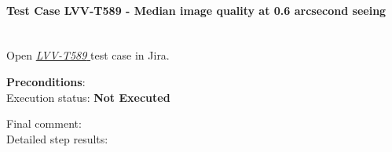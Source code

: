 \documentclass[DM,lsstdraft,STR,toc]{lsstdoc}
\begin{document}
    \paragraph{Test Case LVV-T589 - Median image quality at 0.6 arcsecond seeing
 }\mbox{}\\

Open  \href{https://jira.lsstcorp.org/secure/Tests.jspa#/testCase/LVV-T589}{\textit{ LVV-T589 } }
test case in Jira.

    

    \textbf{ Preconditions}:\\
    

    Execution status: {\bf Not Executed }

    Final comment:\\


    Detailed step results:
\end{document}
